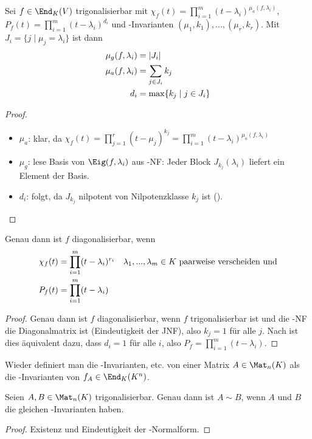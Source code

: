\begin{conclusion}
	Sei $f\in\End_K(V)$ trigonalisierbar mit $\chi_f(t)=\prod_{i=1}^m (t-\lambda_i)^{\mu_a(f,\lambda_i)}$, $P_f(t)=\prod_{i=1}^m (t-\lambda_i)^{d_i}$ und -Invarianten $(\mu_1,k_1),...,(\mu_r,k_r)$. Mit $J_i=\{j\mid \mu_j=\lambda_i\}$ ist dann 
	\begin{align}
		\mu_g(f,\lambda_i)&= \vert J_i \vert \notag \\
		\mu_a(f,\lambda_i) &= \sum_{j\in J_i} k_j\notag \\
		d_i&= \max\{k_j\mid j\in J_i\}\notag
	\end{align}
\end{conclusion}
\begin{proof}
	\begin{itemize}
		\item $\mu_a$: klar, da $\chi_f(t)=\prod_{j=1}^r (t-\mu_j)^{k_j}=\prod_{i=1}^m (t-\lambda_i)^{\mu_a(f,\lambda_i)}$
		\item $\mu_g$: lese Basis von $\Eig(f,\lambda_i)$ aus -NF: Jeder Block $J_{k_j}(\lambda_i)$ liefert ein Element der Basis.
		\item $d_i$: folgt, da $J_{k_j}$ nilpotent von Nilpotenzklasse $k_j$ ist ().
	\end{itemize}
\end{proof}

\begin{conclusion}
	Genau dann ist $f$ diagonalisierbar, wenn 
	\begin{align}
		\chi_f(t)&=\prod_{i=1}^m (t-\lambda_i)^{r_i}\quad \lambda_1,...,\lambda_m\in K\text{ paarweise verscheiden und} \notag \\
		P_f(t) &= \prod_{i=1}^m (t-\lambda_i)\notag
	\end{align}
\end{conclusion}
\begin{proof}
	Genau dann ist $f$ diagonalisierbar, wenn $f$ trigonalisierbar ist und die -NF die Diagonalmatrix ist (Eindeutigkeit der JNF), also $k_j=1$ für alle $j$. Nach  ist dies äquivalent dazu, dass $d_i=1$ für alle $i$, also $P_f=\prod_{i=1}^m (t-\lambda_i)$.
\end{proof}

\begin{remark}
	Wieder definiert man die -Invarianten, etc. von einer Matrix $A\in\Mat_n(K)$ als die -Invarianten von $f_A\in\End_K(K^n)$.
\end{remark}

\begin{conclusion}
	Seien $A,B\in\Mat_n(K)$ trigonalisierbar. Genau dann ist $A\sim B$, wenn $A$ und $B$ die gleichen -Invarianten haben.
\end{conclusion}
\begin{proof}
	Existenz und Eindeutigkeit der -Normalform.
\end{proof}